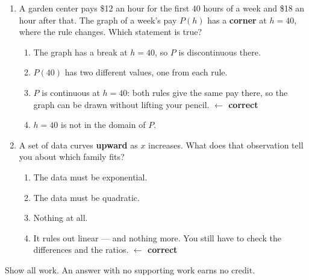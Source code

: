 \begin{enumerate}[leftmargin=1.8em, itemsep=6pt, topsep=5pt]
\item A garden center pays \$12 an hour for the first $40$ hours of a week and \$18 an hour after
that. The graph of a week's pay $P(h)$ has a \textbf{corner} at $h=40$, where the rule changes.
Which statement is true?
\begin{enumerate}[label=(\Alph*), leftmargin=2.2em, itemsep=1pt, topsep=2pt]
  \item The graph has a break at $h=40$, so $P$ is discontinuous there.
  \item $P(40)$ has two different values, one from each rule.
  \item $P$ is continuous at $h=40$: both rules give the same pay there, so the graph can be drawn
        without lifting your pencil. \quad \textcolor{keyred}{\textbf{$\leftarrow$ correct}}
  \item $h=40$ is not in the domain of $P$.
\end{enumerate}

\item A set of data curves \textbf{upward} as $x$ increases. What does that observation tell you
about which family fits?
\begin{enumerate}[label=(\Alph*), leftmargin=2.2em, itemsep=1pt, topsep=2pt]
  \item The data must be exponential.
  \item The data must be quadratic.
  \item Nothing at all.
  \item It rules out linear --- and nothing more. You still have to check the differences and the
        ratios. \quad \textcolor{keyred}{\textbf{$\leftarrow$ correct}}
\end{enumerate}

\end{enumerate}


\noindent\small Show all work. An answer with no supporting work earns no credit.

